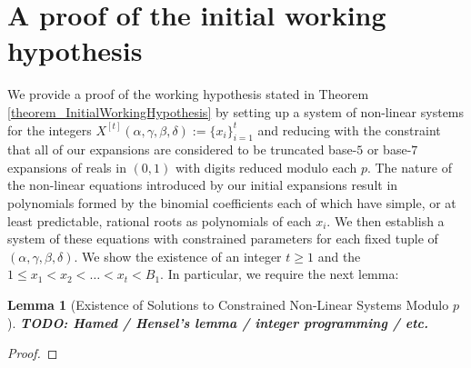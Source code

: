 \documentclass[12pt]{article}
\newtheorem{lemma}[theorem]{Lemma}
\begin{document}
\section{A proof of the initial working hypothesis}

We provide a proof of the working hypothesis stated in Theorem \ref{theorem_InitialWorkingHypothesis} 
by setting up a system of non-linear systems for the integers 
$X^{[t]}(\alpha,\gamma,\beta,\delta) := \{x_i\}_{i=1}^{t}$ and reducing with 
the constraint that all of our expansions are considered to be truncated base-$5$ or base-$7$ expansions of 
reals in $(0, 1)$ with digits reduced modulo each $p$. The nature of the non-linear equations introduced 
by our initial expansions result in polynomials formed by the binomial coefficients each of which have 
simple, or at least predictable, rational roots as polynomials of each $x_i$. 
We then establish a system of these equations with constrained parameters for each fixed tuple of 
$(\alpha,\gamma,\beta,\delta)$. We show the existence of an integer $t \geq 1$ and the 
$1 \leq x_1 < x_2 < \ldots < x_t < B_1$. In particular, we require the 
next lemma: 

\begin{lemma}[Existence of Solutions to Constrained Non-Linear Systems Modulo $p$]
\label{lemma_ExistenceOfSolutionsLemma} 
\textbf{TODO: Hamed / Hensel's lemma / integer programming / etc.}
\end{lemma}
\begin{proof} 
\end{proof} 
\end{document}

